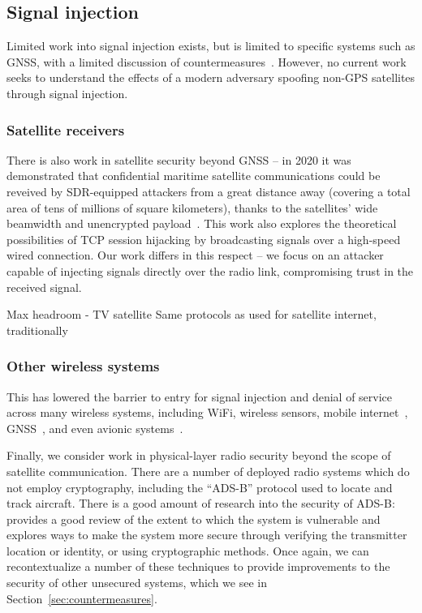\subsection{Signal injection}

Limited work into signal injection exists, but is limited to specific systems such as GNSS, with a limited discussion of countermeasures~\cite{tedeschi2022satellite}.
However, no current work seeks to understand the effects of a modern adversary spoofing non-GPS satellites through signal injection.

\subsubsection{Satellite receivers}

There is also work in satellite security beyond GNSS -- in 2020 it was demonstrated that confidential maritime satellite communications could be reveived by SDR-equipped attackers from a great distance away (covering a total area of tens of millions of square kilometers), thanks to the satellites' wide beamwidth and unencrypted payload~\cite{pavurTale2020}.
This work also explores the theoretical possibilities of TCP session hijacking by broadcasting signals over a high-speed wired connection.
Our work differs in this respect -- we focus on an attacker capable of injecting signals directly over the radio link, compromising trust in the received signal.

Max headroom - TV satellite
Same protocols as used for satellite internet, traditionally

\subsubsection{Other wireless systems}

This has lowered the barrier to entry for signal injection and denial of service across many wireless systems, including WiFi, wireless sensors, mobile internet~\cite{yang2019hiding,erni2021adaptover}, GNSS~\cite{tippenhauer2011requirements}, and even avionic systems~\cite{sathayeWireless2019}.

Finally, we consider work in physical-layer radio security beyond the scope of satellite communication.
There are a number of deployed radio systems which do not employ cryptography, including the ``ADS-B'' protocol used to locate and track aircraft.
There is a good amount of research into the security of ADS-B: \cite{strohmeierSecurity2015} provides a good review of the extent to which the system is vulnerable and explores ways to make the system more secure through verifying the transmitter location or identity, or using cryptographic methods.
Once again, we can recontextualize a number of these techniques to provide improvements to the security of other unsecured systems, which we see in Section~\ref{sec:countermeasures}.




